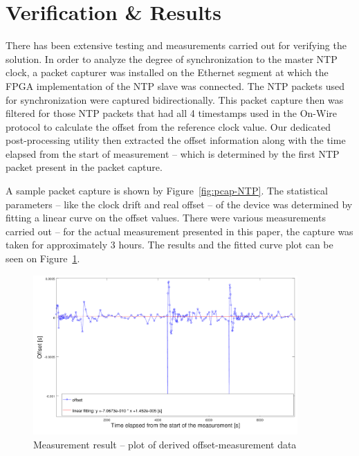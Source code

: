 \documentclass[journal]{IEEEtran}
\begin{document}
\section{Verification \& Results}


There has been extensive testing and measurements carried out for verifying the solution. In order to analyze the degree of
synchronization to the master NTP clock, a packet capturer was installed on the Ethernet
segment at which the FPGA implementation of the NTP slave was connected. The NTP packets used for synchronization were
captured bidirectionally. This packet capture then was filtered for those NTP packets that had all 4 timestamps used in
the On-Wire protocol to calculate the offset from the reference clock value. Our  dedicated post-processing utility then extracted the
offset information along with the time elapsed from the start of measurement -- which is determined by
the
first NTP packet present in the packet capture.

A sample packet capture is shown by Figure~\ref{fig:pcap-NTP}. The statistical parameters -- like the clock drift and real
offset -- of the device was determined by
fitting a linear curve on the offset values. There were various measurements carried out -- for the actual measurement presented in this paper, the capture was taken
for approximately 3 hours.
The results and the fitted curve plot can be seen on Figure~\ref{fig:results}.

\begin{figure}[!htb]
    \centering
    \includegraphics[width=0.9\textwidth]{figures_raw/plot2.png}
    \caption{Measurement result -- plot of derived offset-measurement data}
    \label{fig:results}
\end{figure}
\end{document}
